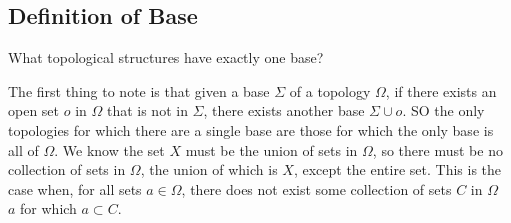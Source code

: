 \subsection{Definition of Base}
\begin{minorEx}[Riddle]%
What topological structures have exactly one base?
\end{minorEx}
The first thing to note is that given a base $\Sigma$ of a topology $\Omega$, if there exists an open set $o$ in $\Omega$ that is not in $\Sigma$, there exists another base $\Sigma \cup o$. SO the only topologies for which there are a single base are those for which the only base is all of $\Omega$. We know the set $X$ must be the union of sets in $\Omega$, so there must be no collection of sets in $\Omega$, the union of which is $X$, except the entire set. This is the case when, for all sets $a \in \Omega$, there does not exist some collection of sets $C$ in $\Omega$ \ $a$ for which $a \subset C$.
